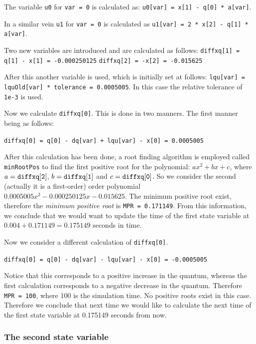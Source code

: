 \documentclass[10pt]{article}
\begin{document}
The variable {\tt{u0}} for {\tt{var = 0}} is calculated as:  {\tt{u0[var] = x[1] - q[0] * a[var]}}.

In a similar vein {\tt{u1}} for {\tt{var = 0}} is calculated as {\tt{u1[var] = 2 * x[2] - q[1] * a[var]}}.

Two new variables are introduced and are calculated as follows:
{\tt{diffxq[1] = q[1] - x[1] = -0.000250125}}
{\tt{diffxq[2] = -x[2] = -0.015625}}

After this another variable is used, which is initially set at follows: {\tt{lqu[var] = lquOld[var] * tolerance = 0.0005005}}. In this case the relative tolerance of {\tt{1e-3}} is used.

Now we calculate {\tt{diffxq[0]}}. This is done in two manners. The first manner being as follows:

{\tt{diffxq[0] = q[0] - dq[var] + lqu[var] - x[0] = 0.0005005}}

After this calculation has been done, a root finding algorithm is employed called {\tt{minRootPos}} to find the first positive root for the polynomial: $ax^2 + bx +c$, where $a = {\tt{diffxq[2]}}$, $b = {\tt{diffxq[1]}}$ and $c = {\tt{diffxq[0]}}$. So we consider the second (actually it is a first-order) order polynomial $0.0005005x^2 -0.000250125x - 0.015625$. The minimum positive root exist, therefore the {\em minimum positive root}  is {\tt{MPR = 0.171149}}. From this information, we conclude that we would want to update the time of the first state variable at $0.004 + 0.171149=0.175149$ seconds in time.

Now we consider a different calculation of {\tt{diffxq[0]}}.

{\tt{diffxq[0] = q[0] - dq[var] - lqu[var] - x[0] = -0.0005005}}

Notice that this corresponds to a positive increase in the quantum, whereas the first calculation corresponds to a negative decrease in the quantum. Therefore {\tt{MPR = 100}}, where 100 is the simulation time. No positive roots exist in this case. Therefore we conclude that next time we would like to calculate the next time of the first state variable at 0.175149 seconds from now.

\subsubsection{The second state variable}
\end{document}
